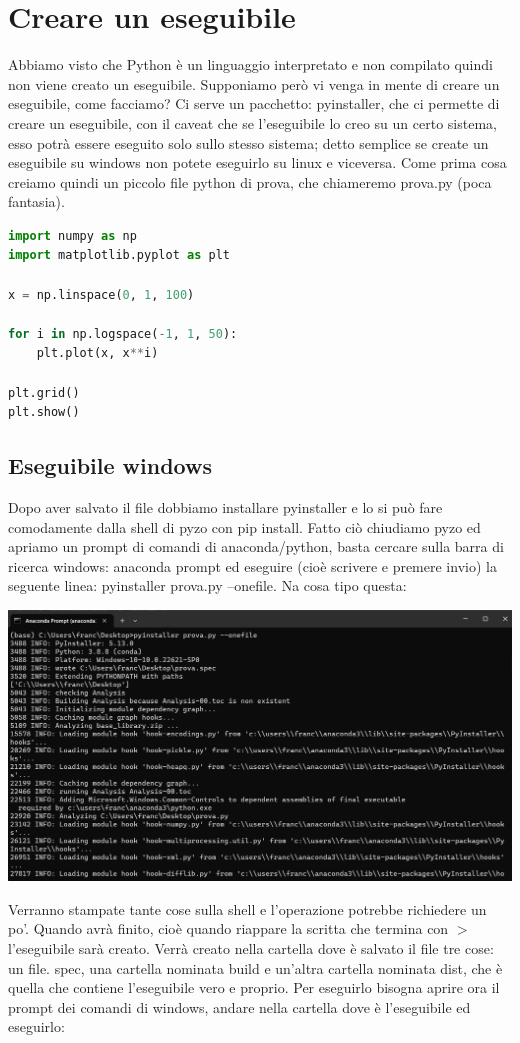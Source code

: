 \documentclass[10pt,a4paper]{article}
\begin{document}
\newpage


\section{Creare un eseguibile}

Abbiamo visto che Python è un linguaggio interpretato e non compilato quindi non viene creato un eseguibile. Supponiamo però vi venga in mente di creare un eseguibile, come facciamo?
Ci serve un pacchetto: pyinstaller, che ci permette di creare un eseguibile, con il caveat che se l'eseguibile lo creo su un certo sistema, esso potrà essere eseguito solo sullo stesso sistema; detto semplice se create un eseguibile su windows non potete eseguirlo su linux e viceversa. Come prima cosa creiamo quindi un piccolo file python di prova, che chiameremo prova.py (poca fantasia).

\begin{lstlisting}[language=Python]
import numpy as np
import matplotlib.pyplot as plt

x = np.linspace(0, 1, 100)

for i in np.logspace(-1, 1, 50):
    plt.plot(x, x**i)

plt.grid()
plt.show()
\end{lstlisting}

\subsection{Eseguibile windows}

Dopo aver salvato il file dobbiamo installare pyinstaller e lo si può fare comodamente dalla shell di pyzo con pip install.
Fatto ciò chiudiamo pyzo ed apriamo un prompt di comandi di anaconda/python, basta cercare sulla barra di ricerca windows: anaconda prompt ed eseguire (cioè scrivere e premere invio) la seguente linea: pyinstaller prova.py --onefile. Na cosa tipo questa:

\begin{center}
\includegraphics[scale=0.35]{img/p_1.png}
\end{center}
Verranno stampate tante cose sulla shell e l'operazione potrebbe richiedere un po'. Quando avrà finito, cioè quando riappare la scritta che termina con $>$ l'eseguibile sarà creato. Verrà creato nella cartella dove è salvato il file tre cose: un file. spec, una cartella nominata build e un'altra cartella nominata dist, che è quella che contiene l'eseguibile vero e proprio. Per eseguirlo bisogna aprire ora il prompt dei comandi di windows, andare nella cartella dove è l'eseguibile ed eseguirlo:
\end{document}
